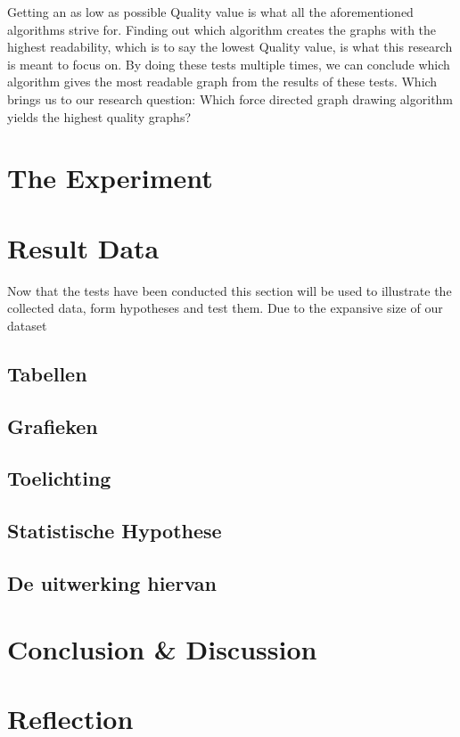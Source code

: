 \documentclass[a4paper,12pt]{article}
\begin{document}
    Getting an as low as possible Quality value is what all the aforementioned algorithms strive for.
    Finding out which algorithm creates the graphs with the highest readability, which is to say the lowest Quality value, is what this research is meant to focus on.
    By doing these tests multiple times, we can conclude which algorithm gives the most readable graph from the results of these tests.
    Which brings us to our research question: Which force directed graph drawing algorithm yields the highest quality graphs?

  \section{The Experiment} %

  \section{Result Data} %
  Now that the tests have been conducted this section will be used to illustrate the collected data, form hypotheses and test them. Due to the expansive size of our dataset 
  
  \subsection{Tabellen} %
  \subsection{Grafieken}
  \subsection{Toelichting}
  \subsection{Statistische Hypothese}
  \subsection{De uitwerking hiervan}

  \section{Conclusion \& Discussion}
  \section{Reflection}

  {}
  
\end{document}
